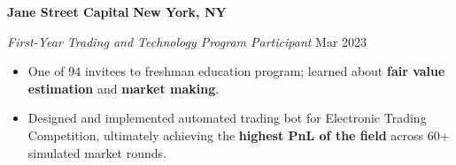 \textbf{Jane Street Capital} \hfill \textbf{New York, NY}\par
\textit{First-Year Trading and Technology Program Participant} \hfill Mar 2023

\begin{itemize}
	\item One of 94 invitees to freshman education program; learned about \textbf{fair value estimation} and \textbf{market making}.
	\item Designed and implemented automated trading bot for Electronic Trading Competition, ultimately achieving the \textbf{highest PnL of the field} across 60+ simulated market rounds.
\end{itemize}\par